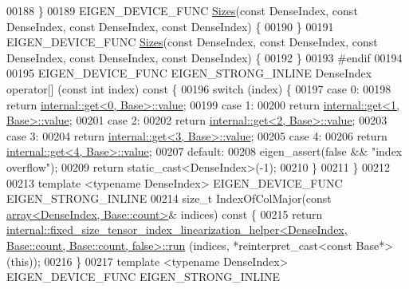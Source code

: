 \begin{DoxyCode}
00188   \}
00189   EIGEN\_DEVICE\_FUNC \hyperlink{struct_eigen_1_1_sizes}{Sizes}(\textcolor{keyword}{const} DenseIndex, \textcolor{keyword}{const} DenseIndex, \textcolor{keyword}{const} DenseIndex, \textcolor{keyword}{const} DenseIndex) \{
00190   \}
00191   EIGEN\_DEVICE\_FUNC \hyperlink{struct_eigen_1_1_sizes}{Sizes}(\textcolor{keyword}{const} DenseIndex, \textcolor{keyword}{const} DenseIndex, \textcolor{keyword}{const} DenseIndex, \textcolor{keyword}{const} DenseIndex, \textcolor{keyword}{
      const} DenseIndex) \{
00192   \}
00193 \textcolor{preprocessor}{#endif}
00194 
00195   EIGEN\_DEVICE\_FUNC EIGEN\_STRONG\_INLINE DenseIndex operator[] (\textcolor{keyword}{const} \textcolor{keywordtype}{int} index)\textcolor{keyword}{ const }\{
00196     \textcolor{keywordflow}{switch} (index) \{
00197       \textcolor{keywordflow}{case} 0:
00198         \textcolor{keywordflow}{return} \hyperlink{struct_eigen_1_1internal_1_1get}{internal::get<0, Base>::value};
00199       \textcolor{keywordflow}{case} 1:
00200         \textcolor{keywordflow}{return} \hyperlink{struct_eigen_1_1internal_1_1get}{internal::get<1, Base>::value};
00201       \textcolor{keywordflow}{case} 2:
00202         \textcolor{keywordflow}{return} \hyperlink{struct_eigen_1_1internal_1_1get}{internal::get<2, Base>::value};
00203       \textcolor{keywordflow}{case} 3:
00204         \textcolor{keywordflow}{return} \hyperlink{struct_eigen_1_1internal_1_1get}{internal::get<3, Base>::value};
00205       \textcolor{keywordflow}{case} 4:
00206         \textcolor{keywordflow}{return} \hyperlink{struct_eigen_1_1internal_1_1get}{internal::get<4, Base>::value};
00207       \textcolor{keywordflow}{default}:
00208         eigen\_assert(\textcolor{keyword}{false} && \textcolor{stringliteral}{"index overflow"});
00209         \textcolor{keywordflow}{return} \textcolor{keyword}{static\_cast<}DenseIndex\textcolor{keyword}{>}(-1);
00210     \}
00211   \}
00212 
00213   \textcolor{keyword}{template} <\textcolor{keyword}{typename} DenseIndex> EIGEN\_DEVICE\_FUNC EIGEN\_STRONG\_INLINE
00214   \textcolor{keywordtype}{size\_t} IndexOfColMajor(\textcolor{keyword}{const} \hyperlink{class_eigen_1_1array}{array<DenseIndex, Base::count>}& indices)\textcolor{keyword}{ const
       }\{
00215     \textcolor{keywordflow}{return} 
      \hyperlink{struct_eigen_1_1internal_1_1fixed__size__tensor__index__linearization__helper}{internal::fixed\_size\_tensor\_index\_linearization\_helper<DenseIndex, Base::count, Base::count, false>::run}
      (indices, *reinterpret\_cast<const Base*>(\textcolor{keyword}{this}));
00216   \}
00217   \textcolor{keyword}{template} <\textcolor{keyword}{typename} DenseIndex> EIGEN\_DEVICE\_FUNC EIGEN\_STRONG\_INLINE

\end{DoxyCode}
